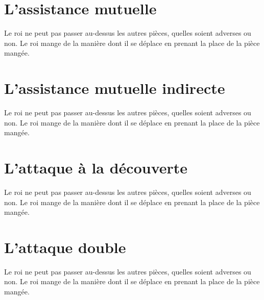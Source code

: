 \documentclass[a5paper,openany,twocolumn]{book}%
\begin{document}

\chapter{L'assistance mutuelle}

Le roi ne peut pas passer au-dessus les autres pièces, quelles soient adverses ou non. Le roi mange de la manière dont il se déplace en prenant la place de la pièce mangée. 


\chapter{L'assistance mutuelle indirecte}

Le roi ne peut pas passer au-dessus les autres pièces, quelles soient adverses ou non. Le roi mange de la manière dont il se déplace en prenant la place de la pièce mangée. 


\chapter{L'attaque à la découverte}

Le roi ne peut pas passer au-dessus les autres pièces, quelles soient adverses ou non. Le roi mange de la manière dont il se déplace en prenant la place de la pièce mangée. 


\chapter{L'attaque double}

Le roi ne peut pas passer au-dessus les autres pièces, quelles soient adverses ou non. Le roi mange de la manière dont il se déplace en prenant la place de la pièce mangée. 

\end{document}
